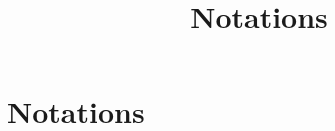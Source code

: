 \ifx\inthesis\undefined %

\title{Notations}

\maketitle
\else %
\chapter*{Notations}
\fi %

\ifx\inthesis\undefined
\printbibliography
\else\relax\fi
